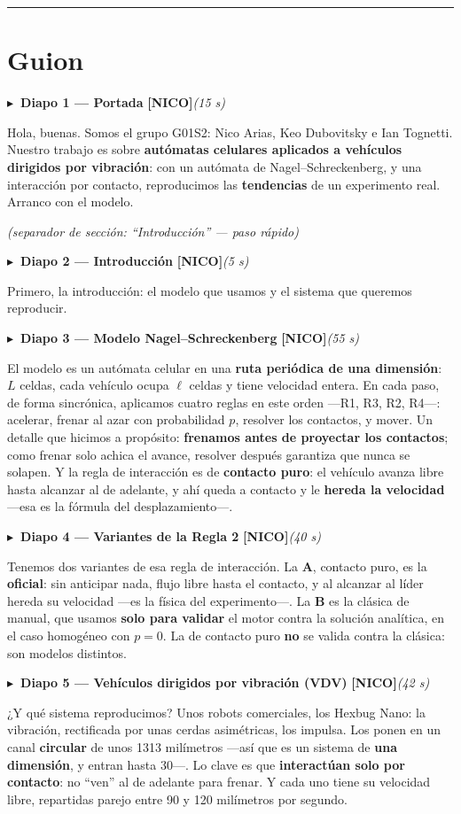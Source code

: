 \documentclass[11pt,a4paper]{article}
\newcommand{\diapo}[5]{%
  \medskip\par\noindent
  \textcolor{#4}{\textbf{$\blacktriangleright$\ Diapo #1 --- #2}}\quad
  \textcolor{#4}{\textbf{[#3]}}\hfill{\itshape\small(#5)}\par\nobreak\smallskip
}
\newcommand{\seccion}[1]{\smallskip\par\noindent\textit{(separador de sección: ``#1'' --- paso rápido)}\par}
\begin{document}
\vspace{4pt}
\hrule
\vspace{4pt}

\section*{Guion}

\diapo{1}{Portada}{NICO}{cnico}{15 s}
Hola, buenas. Somos el grupo G01S2: Nico Arias, Keo Dubovitsky e Ian Tognetti. Nuestro trabajo es sobre
\textbf{autómatas celulares aplicados a vehículos dirigidos por vibración}: con un autómata de
Nagel--Schreckenberg, y una interacción por contacto, reproducimos las \textbf{tendencias} de un
experimento real. Arranco con el modelo.

\seccion{Introducción}
\diapo{2}{Introducción}{NICO}{cnico}{5 s}
Primero, la introducción: el modelo que usamos y el sistema que queremos reproducir.

\diapo{3}{Modelo Nagel--Schreckenberg}{NICO}{cnico}{55 s}
El modelo es un autómata celular en una \textbf{ruta periódica de una dimensión}: $L$ celdas, cada
vehículo ocupa $\ell$ celdas y tiene velocidad entera. En cada paso, de forma sincrónica, aplicamos cuatro
reglas en este orden ---R1, R3, R2, R4---: acelerar, frenar al azar con probabilidad $p$, resolver los
contactos, y mover. Un detalle que hicimos a propósito: \textbf{frenamos antes de proyectar los
contactos}; como frenar solo achica el avance, resolver después garantiza que nunca se solapen. Y la
regla de interacción es de \textbf{contacto puro}: el vehículo avanza libre hasta alcanzar al de adelante,
y ahí queda a contacto y le \textbf{hereda la velocidad} ---esa es la fórmula del desplazamiento---.

\diapo{4}{Variantes de la Regla 2}{NICO}{cnico}{40 s}
Tenemos dos variantes de esa regla de interacción. La \textbf{A}, contacto puro, es la \textbf{oficial}:
sin anticipar nada, flujo libre hasta el contacto, y al alcanzar al líder hereda su velocidad ---es la
física del experimento---. La \textbf{B} es la clásica de manual, que usamos \textbf{solo para validar} el
motor contra la solución analítica, en el caso homogéneo con $p=0$. La de contacto puro \textbf{no} se
valida contra la clásica: son modelos distintos.

\diapo{5}{Vehículos dirigidos por vibración (VDV)}{NICO}{cnico}{42 s}
¿Y qué sistema reproducimos? Unos robots comerciales, los Hexbug Nano: la vibración, rectificada por unas
cerdas asimétricas, los impulsa. Los ponen en un canal \textbf{circular} de unos 1313 milímetros ---así que
es un sistema de \textbf{una dimensión}, y entran hasta 30---. Lo clave es que \textbf{interactúan solo por
contacto}: no ``ven'' al de adelante para frenar. Y cada uno tiene su velocidad libre, repartidas parejo
entre 90 y 120 milímetros por segundo.
\end{document}
